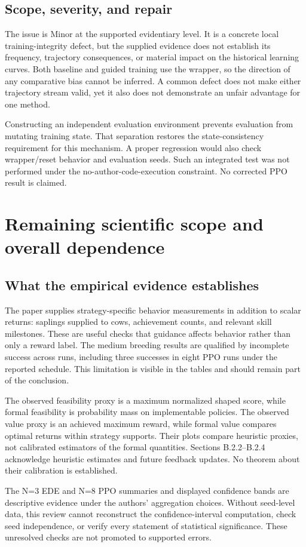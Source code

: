 \documentclass[10pt]{article}
\begin{document}
\subsection*{Scope, severity, and repair}
The issue is Minor at the supported evidentiary level. It is a concrete local training-integrity defect, but the supplied evidence does not establish its frequency, trajectory consequences, or material impact on the historical learning curves. Both baseline and guided training use the wrapper, so the direction of any comparative bias cannot be inferred. A common defect does not make either trajectory stream valid, yet it also does not demonstrate an unfair advantage for one method.\par
Constructing an independent evaluation environment prevents evaluation from mutating training state. That separation restores the state-consistency requirement for this mechanism. A proper regression would also check wrapper/reset behavior and evaluation seeds. Such an integrated test was not performed under the no-author-code-execution constraint. No corrected PPO result is claimed.\par
\section*{Remaining scientific scope and overall dependence}
\subsection*{What the empirical evidence establishes}
The paper supplies strategy-specific behavior measurements in addition to scalar returns: saplings supplied to cows, achievement counts, and relevant skill milestones. These are useful checks that guidance affects behavior rather than only a reward label. The medium breeding results are qualified by incomplete success across runs, including three successes in eight PPO runs under the reported schedule. This limitation is visible in the tables and should remain part of the conclusion.\par
The observed feasibility proxy is a maximum normalized shaped score, while formal feasibility is probability mass on implementable policies. The observed value proxy is an achieved maximum reward, while formal value compares optimal returns within strategy supports. Their plots compare heuristic proxies, not calibrated estimators of the formal quantities. Sections B.2.2–B.2.4 acknowledge heuristic estimates and future feedback updates. No theorem about their calibration is established.\par
The N=3 EDE and N=8 PPO summaries and displayed confidence bands are descriptive evidence under the authors’ aggregation choices. Without seed-level data, this review cannot reconstruct the confidence-interval computation, check seed independence, or verify every statement of statistical significance. These unresolved checks are not promoted to supported errors.\par
\end{document}
